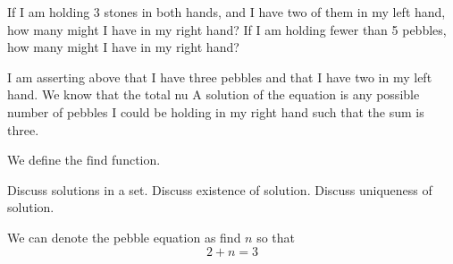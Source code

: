 
\sbasic













\sstart
{}


If I am holding
3 stones
in both hands,
and I have two of
them in my left hand,
how many might I have
in my right hand?
If I am holding
fewer than 5 pebbles, how
many might I have in my right hand?


I am
asserting above
that I have three
pebbles and that
I have two in my
left hand.
We know that the
total nu
A solution of
the equation
is any possible
number of pebbles
I could be holding
in my right hand
such that the sum
is three.

We define the $\text{find}$
function.

Discuss solutions
in a set.
Discuss existence
of solution.
Discuss uniqueness
of solution.


We can
denote the pebble
equation as
find $n$ so that
\[
  2 + n = 3
\]
\strats

